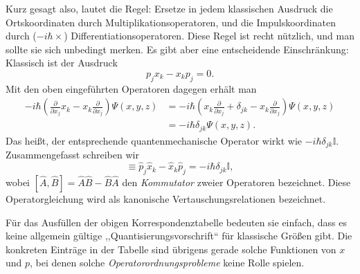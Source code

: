 Kurz gesagt also, lautet die Regel: Ersetze in jedem klassischen Ausdruck die Ortskoordinaten durch Multiplikationsoperatoren, und die Impulskoordinaten durch ($-i\hbar \times$) Differentiationsoperatoren. Diese Regel ist recht nützlich, und man sollte sie sich unbedingt merken. Es gibt aber eine entscheidende Einschränkung: Klassisch ist der Ausdruck 
\begin{equation*}
	p_j x_k - x_k p_j = 0.
\end{equation*}
Mit den oben eingeführten Operatoren dagegen erhält man
\begin{equation}
	\begin{split}
		-i \hbar \left(\frac{\partial}{\partial x_j}x_k - x_k \frac{\partial}{\partial x_j}\right)\Psi(x,y,z) &= -i \hbar \left(x_k\frac{\partial}{\partial x_j}  + \delta_{jk} - x_k \frac{\partial}{\partial x_j} \right)\Psi(x,y,z) \\
		&= -i\hbar \delta_{jk} \Psi(x,y,z).
	\end{split}
\end{equation}
Das heißt, der entsprechende quantenmechanische Operator wirkt wie $-i\hbar\delta_{jk}\mathbb{I}$. Zusammengefasst schreiben wir
\begin{equation}
	[\widehat{p}_j,\widehat{x}_k]\equiv\widehat{p}_j\widehat{x}_k - \widehat{x}_k  \widehat{p}_j = -i\hbar\delta_{jk}\mathbb{I},
\end{equation} 
wobei $[\widehat{A},\widehat{B}] = \widehat{A}\widehat{B} - \widehat{B}\widehat{A}$ den \emph{Kommutator} zweier Operatoren bezeichnet. Diese Operatorgleichung wird als kanonische Vertauschungsrelationen bezeichnet.

Für das Ausfüllen der obigen Korrespondenztabelle bedeuten sie einfach, dass es keine allgemein gültige ,,Quantisierungsvorschrift`` für klassische Größen gibt. Die konkreten Einträge in der Tabelle sind übrigens gerade solche Funktionen von $x$ und $p$, bei denen solche \emph{Operatorordnungsprobleme} keine Rolle spielen.

